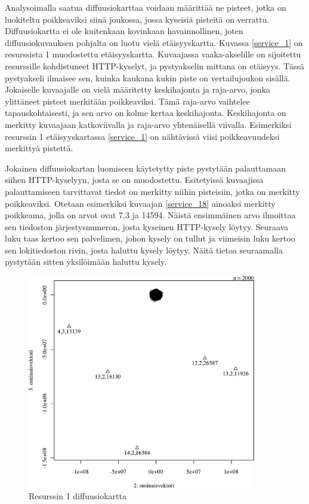 Analysoimalla saatua diffuusiokarttaa voidaan määrittää ne pisteet, jotka on luokiteltu poikkeaviksi siinä joukossa, jossa kyseisiä pisteitä on 
verrattu. Diffuusiokartta ei ole kuitenkaan kovinkaan havainnollinen, joten diffuusiokuvauksen pohjalta on luotu vielä etäisyyskartta. Kuvassa
\ref{service_1} on resurssista 1 muodostettu etäisyyskartta. Kuvaajassa vaaka-akselille on sijoitettu resurssille kohdistuneet HTTP-kyselyt,
ja pystyakselin mittana on etäisyys. Tässä pystyakseli ilmaisee sen, kuinka kaukana kukin piste on vertailujoukon sisällä. Jokaiselle kuvaajalle
on vielä määritetty keskihajonta ja raja-arvo, jonka ylittäneet pisteet merkitään poikkeaviksi. Tämä raja-arvo vaihtelee tapauskohtaisesti, ja sen
arvo on kolme kertaa keskihajonta. Keskihajonta on merkitty kuvaajaan katkoviivalla ja raja-arvo yhtenäisellä viivalla. Esimerkiksi resurssin 1 
etäisyyskartassa \ref{service_1} on nähtävissä viisi poikkeavuudeksi merkittyä pistettä.

Jokainen diffuusiokartan luomiseen käytetytty piste pystytään palauttamaan siihen HTTP-kyselyyn, josta se on muodostettu. Esitetyissä kuvaajissa
palauttamiseen tarvittavat tiedot on merkitty niihin pisteisiin, jotka on merkitty poikkeaviksi. Otetaan esimerkiksi kuvaajan \ref{service_18}
ainoaksi merkitty poikkeama, jolla on arvot ovat 7,3 ja 14594. Näistä ensimmäinen arvo ilmoittaa sen tiedoston järjestysnumeron, josta kyseinen 
HTTP-kysely löytyy. Seuraava luku taas kertoo sen palvelimen, johon kysely on tullut ja viimeisin luku kertoo sen lokitiedoston rivin, josta
haluttu kysely löytyy. Näitä tietoa seuraamalla pystytään sitten yksilöimään haluttu kysely.
   
\begin{figure}[p]
\centering
\includegraphics[width=10cm]{pics/diffuusiokuvat/service_1.pdf}
\caption{Resurssin 1 diffuusiokartta}
\label{diffusio_1}
\end{figure}

